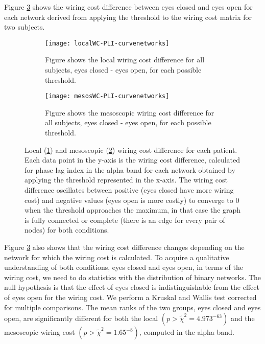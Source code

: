 \documentclass[11pt, onecolumn]{article}
\begin{document}
{%
Figure \ref{fig:wcindivpats} shows the wiring cost difference between eyes closed and eyes open for each network derived from applying the threshold to the wiring cost matrix for two subjects.


\begin{figure}[ht] 
  \begin{subfigure}[t]{0.5\linewidth}
    \centering
    \texttt{[image: localWC-PLI-curvenetworks]} 
    \caption{Figure shows the local wiring cost difference for all subjects, eyes closed - eyes open, for each possible threshold. } 
    \label{fig:wcindivpats:a} 
    \vspace{4ex}
  \end{subfigure}%
  \hspace{1ex}
  \begin{subfigure}[t]{0.5\linewidth} \hfill
    \centering
    \texttt{[image: mesosWC-PLI-curvenetworks]} 
    \caption{Figure shows the mesoscopic wiring cost difference for all subjects, eyes closed - eyes open, for each possible threshold. } 
    \label{fig:wcindivpats:b} 
    \vspace{4ex}
  \end{subfigure} 
  \caption{Local (\ref{fig:wcindivpats:a}) and mesoscopic (\ref{fig:wcindivpats:b}) wiring cost difference for each patient. Each data point in the y-axis is the wiring cost difference, calculated for phase lag index in the alpha band for each network obtained by applying the threshold represented in the x-axis.
The wiring cost difference oscillates between positive (eyes closed have more wiring cost) and negative values (eyes open is more costly) to converge to 0 when the threshold approaches the maximum, in that case the graph is fully connected or complete (there is an edge for every pair of nodes) for both conditions.}
  \label{fig:wcindivpats} 
\end{figure}

Figure \ref{fig:wcindivpats} also shows that the wiring cost difference changes depending on the network for which the wiring cost is calculated. To acquire a qualitative understanding of both conditions, eyes closed and eyes open, in terms of the wiring cost, we need to do statistics with the distribution of binary networks.
The null hypothesis is that the effect of eyes closed is indistinguishable from the effect of eyes open for the wiring cost.
We perform a Kruskal and Wallis test corrected for multiple comparisons. The mean ranks of the two groups, eyes closed and eyes open, are significantly different for both the local $(p > \tilde{\chi}^2 = 4.973^{-63})$ and the mesoscopic wiring cost $(p > \tilde{\chi}^2 = 1.65^{-8})$, computed in the alpha band.
 
}
\end{document}
